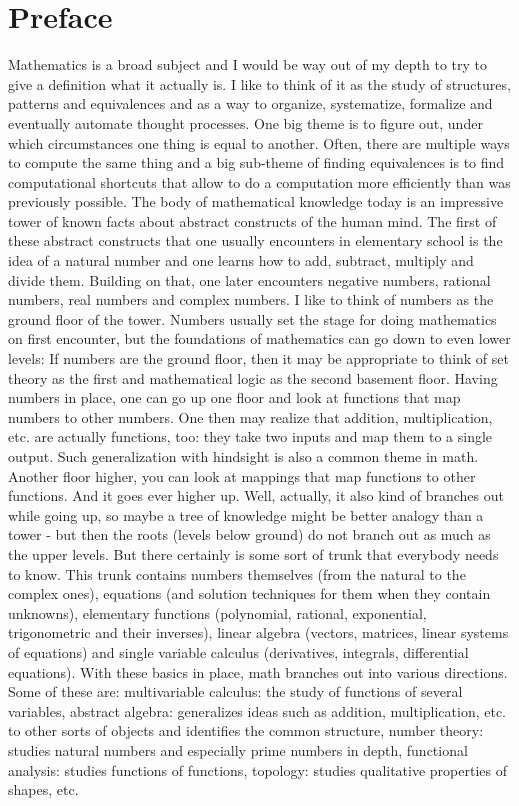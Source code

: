 \chapter{Preface}
Mathematics is a broad subject and I would be way out of my depth to try to give a definition what it actually is. I like to think of it as the study of structures, patterns and equivalences and as a way to organize, systematize, formalize and eventually automate thought processes. One big theme is to figure out, under which circumstances one thing is equal to another. Often, there are multiple ways to compute the same thing and a big sub-theme of finding equivalences is to find computational shortcuts that allow to do a computation more efficiently than was previously possible. The body of mathematical knowledge today is an impressive tower of known facts about abstract constructs of the human mind. The first of these abstract constructs that one usually encounters in elementary school is the idea of a natural number and one learns how to add, subtract, multiply and divide them. Building on that, one later encounters negative numbers, rational numbers, real numbers and complex numbers. I like to think of numbers as the ground floor of the tower. Numbers usually set the stage for doing mathematics on first encounter, but the foundations of mathematics can go down to even lower levels: If numbers are the ground floor, then it may be appropriate to think of set theory as the first and mathematical logic as the second basement floor. Having numbers in place, one can go up one floor and look at functions that map numbers to other numbers. One then may realize that addition, multiplication, etc. are actually functions, too: they take two inputs and map them to a single output. Such generalization with hindsight is also a common theme in math. Another floor higher, you can look at mappings that map functions to other functions. And it goes ever higher up. Well, actually, it also kind of branches out while going up, so maybe a tree of knowledge might be better analogy than a tower - but then the roots (levels below ground) do not branch out as much as the upper levels. But there certainly is some sort of trunk that everybody needs to know. This trunk contains numbers themselves (from the natural to the complex ones), equations (and solution techniques for them when they contain unknowns), elementary functions (polynomial, rational, exponential, trigonometric and their inverses), linear algebra (vectors, matrices, linear systems of equations) and single variable calculus (derivatives, integrals, differential equations). With these basics in place, math branches out into various directions. Some of these are: multivariable calculus: the study of functions of several variables, abstract algebra: generalizes ideas such as addition, multiplication, etc. to other sorts of objects and identifies the common structure, number theory: studies natural numbers and especially prime numbers in depth, functional analysis: studies functions of functions, topology: studies qualitative properties of shapes, etc. 

